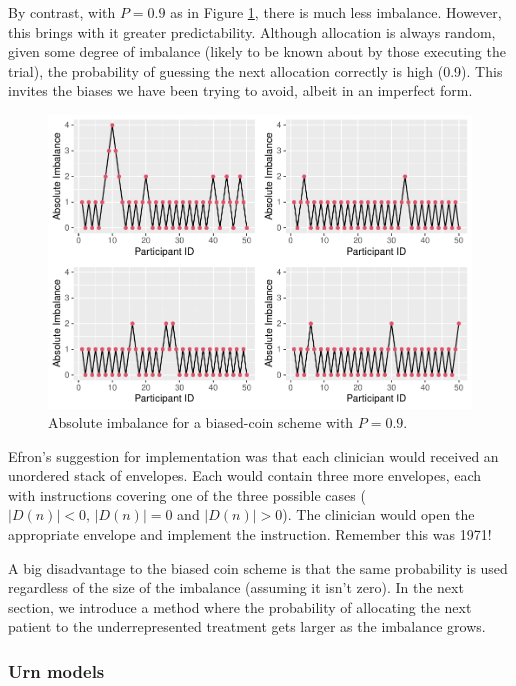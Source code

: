 \documentclass[
  openany]{book}
\theoremstyle{definition}
\theoremstyle{definition}
\theoremstyle{definition}
\theoremstyle{definition}
\theoremstyle{remark}
\begin{document}
By contrast, with \(P=0.9\) as in Figure \ref{fig:p-nearlyone}, there is much less imbalance. However, this brings with it greater predictability. Although allocation is always random, given some degree of imbalance (likely to be known about by those executing the trial), the probability of guessing the next allocation correctly is high (0.9). This invites the biases we have been trying to avoid, albeit in an imperfect form.

\begin{figure}
\centering
\includegraphics{CT4H_notes_files/figure-latex/p-nearlyone-1.pdf}
\caption{\label{fig:p-nearlyone}Absolute imbalance for a biased-coin scheme with \(P = 0.9\).}
\end{figure}

Efron's suggestion for implementation was that each clinician would received an unordered stack of envelopes. Each would contain three more envelopes, each with instructions covering one of the three possible cases (\(\lvert D\left(n\right)\rvert<0,\,\lvert D\left(n\right)\rvert=0\) and \(\lvert D\left(n\right)\rvert>0\)). The clinician would open the appropriate envelope and implement the instruction. Remember this was 1971!

A big disadvantage to the biased coin scheme is that the same probability is used regardless of the size of the imbalance (assuming it isn't zero). In the next section, we introduce a method where the probability of allocating the next patient to the underrepresented treatment gets larger as the imbalance grows.

\subsubsection{Urn models}\label{urn-models}
\end{document}
